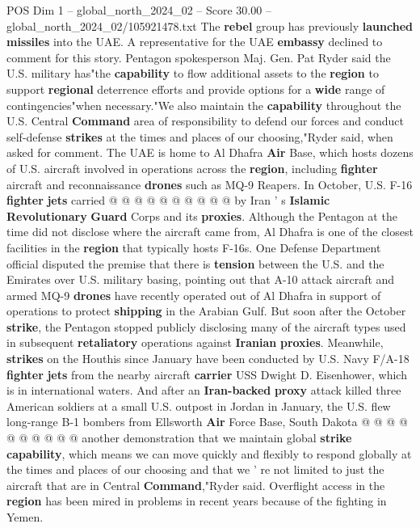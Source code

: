 \begin{textsample}{POS Dim 1 – global\_north\_2024\_02 – Score 30.00 – global\_north\_2024\_02/105921478.txt}
The \textbf{rebel} group has previously \textbf{launched} \textbf{missiles} into the UAE.
A representative for the UAE \textbf{embassy} declined to comment for this story.
Pentagon spokesperson Maj.
Gen.
Pat Ryder said the U.S. military has"the \textbf{capability} to flow additional assets to the \textbf{region} to support \textbf{regional} deterrence efforts and provide options for a \textbf{wide} range of contingencies"when necessary."We also maintain the \textbf{capability} throughout the U.S.
Central \textbf{Command} area of responsibility to defend our forces and conduct self-defense \textbf{strikes} at the times and places of our choosing,"Ryder said, when asked for comment.
The UAE is home to Al Dhafra \textbf{Air} Base, which hosts dozens of U.S. aircraft involved in operations across the \textbf{region}, including \textbf{fighter} aircraft and reconnaissance \textbf{drones} such as MQ-9 Reapers.
In October, U.S.
F-16 \textbf{fighter} \textbf{jets} carried @ @ @ @ @ @ @ @ @ @ by Iran ' s \textbf{Islamic} \textbf{Revolutionary} \textbf{Guard} Corps and its \textbf{proxies}.
Although the Pentagon at the time did not disclose where the aircraft came from, Al Dhafra is one of the closest facilities in the \textbf{region} that typically hosts F-16s.
One Defense Department official disputed the premise that there is \textbf{tension} between the U.S. and the Emirates over U.S. military basing, pointing out that A-10 attack aircraft and armed MQ-9 \textbf{drones} have recently operated out of Al Dhafra in support of operations to protect \textbf{shipping} in the Arabian Gulf.
But soon after the October \textbf{strike}, the Pentagon stopped publicly disclosing many of the aircraft types used in subsequent \textbf{retaliatory} operations against \textbf{Iranian} \textbf{proxies}.
Meanwhile, \textbf{strikes} on the Houthis since January have been conducted by U.S.
Navy F/A-18 \textbf{fighter} \textbf{jets} from the nearby aircraft \textbf{carrier} USS Dwight D.
Eisenhower, which is in international waters.
And after an \textbf{Iran-backed} \textbf{proxy} attack killed three American soldiers at a small U.S. outpost in Jordan in January, the U.S. flew long-range B-1 bombers from Ellsworth \textbf{Air} Force Base, South Dakota @ @ @ @ @ @ @ @ @ @ another demonstration that we maintain global \textbf{strike} \textbf{capability}, which means we can move quickly and flexibly to respond globally at the times and places of our choosing and that we ' re not limited to just the aircraft that are in Central \textbf{Command},"Ryder said.
Overflight access in the \textbf{region} has been mired in problems in recent years because of the fighting in Yemen.

\end{textsample}
